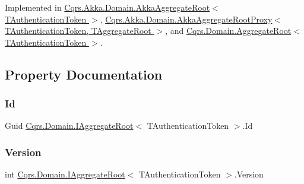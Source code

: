 Implemented in \hyperlink{classCqrs_1_1Akka_1_1Domain_1_1AkkaAggregateRoot_a0d2615067175e5f8249bb2dc3d17ee0b_a0d2615067175e5f8249bb2dc3d17ee0b}{Cqrs.\+Akka.\+Domain.\+Akka\+Aggregate\+Root$<$ T\+Authentication\+Token $>$}, \hyperlink{classCqrs_1_1Akka_1_1Domain_1_1AkkaAggregateRootProxy_aaa8a46fee21b6133ae4d1b2f60983d7e_aaa8a46fee21b6133ae4d1b2f60983d7e}{Cqrs.\+Akka.\+Domain.\+Akka\+Aggregate\+Root\+Proxy$<$ T\+Authentication\+Token, T\+Aggregate\+Root $>$}, and \hyperlink{classCqrs_1_1Domain_1_1AggregateRoot_adab968b830e186cb832583910bf6f3a6_adab968b830e186cb832583910bf6f3a6}{Cqrs.\+Domain.\+Aggregate\+Root$<$ T\+Authentication\+Token $>$}.



\subsection{Property Documentation}
\mbox{\label{interfaceCqrs_1_1Domain_1_1IAggregateRoot_a04aa3198f1371afa345a58e8fcb713d7_a04aa3198f1371afa345a58e8fcb713d7}} 
\subsubsection{\texorpdfstring{Id}{Id}}
{\footnotesize\ttfamily Guid \hyperlink{interfaceCqrs_1_1Domain_1_1IAggregateRoot}{Cqrs.\+Domain.\+I\+Aggregate\+Root}$<$ T\+Authentication\+Token $>$.Id\hspace{0.3cm}{\ttfamily [get]}}

\mbox{\label{interfaceCqrs_1_1Domain_1_1IAggregateRoot_ad81adab68c0984330f735a1f5a661aa7_ad81adab68c0984330f735a1f5a661aa7}} 
\subsubsection{\texorpdfstring{Version}{Version}}
{\footnotesize\ttfamily int \hyperlink{interfaceCqrs_1_1Domain_1_1IAggregateRoot}{Cqrs.\+Domain.\+I\+Aggregate\+Root}$<$ T\+Authentication\+Token $>$.Version\hspace{0.3cm}{\ttfamily [get]}}

